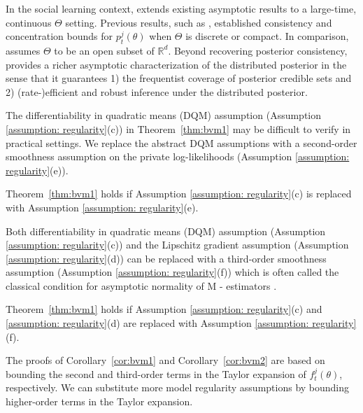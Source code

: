 \documentclass[twoside,11pt]{article}
\numberwithin{equation}{section}
\newcommand{\R}{{\mathbb{R}}}
\begin{document}
{In the social learning context,  extends existing asymptotic results to a large-time, continuous $\Theta$ setting. Previous results, such as \cite{Uribe2022-1,Uribe2022-2}, established consistency and concentration bounds for $p_t^j(\theta)$ when $\Theta$ is discrete or compact. In comparison,  assumes $\Theta$ to be an open subset of $\R^d$. Beyond recovering posterior consistency,  provides a richer asymptotic characterization of the distributed posterior in the sense that it guarantees 1) the frequentist coverage of posterior credible sets and 2) (rate-)efficient and robust inference under the distributed posterior.

The differentiability in quadratic means (DQM) assumption (Assumption \ref{assumption: regularity}(c)) in Theorem~\ref{thm:bvm1} may be difficult to verify in practical settings. We replace the abstract DQM assumptions with a second-order smoothness assumption on the private log-likelihoods (Assumption \ref{assumption: regularity}(e)). 

\begin{corollary} \label{cor:bvm1}
 Theorem~\ref{thm:bvm1} holds if  Assumption \ref{assumption: regularity}(c) is replaced with Assumption \ref{assumption: regularity}(e).
\end{corollary}

Both differentiability in quadratic means (DQM) assumption (Assumption \ref{assumption: regularity}(c)) and the Lipschitz gradient assumption (Assumption \ref{assumption: regularity}(d)) can be replaced with a third-order smoothness assumption (Assumption \ref{assumption: regularity}(f)) which is often called the classical condition for asymptotic normality of M - estimators \citep{VanderVaart2000}. 
\begin{corollary} \label{cor:bvm2}
 Theorem~\ref{thm:bvm1} holds if  Assumption \ref{assumption: regularity}(c) and \ref{assumption: regularity}(d) are replaced with Assumption \ref{assumption: regularity}(f).
\end{corollary}
The proofs of Corollary~\ref{cor:bvm1} and Corollary~\ref{cor:bvm2} are based on bounding the second and third-order terms in the Taylor expansion of $f_t^j(\theta)$, respectively. We can substitute more model regularity assumptions by bounding higher-order terms in the Taylor expansion. 

}
\end{document}
